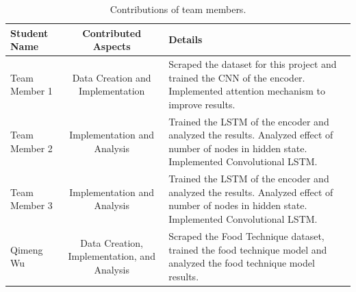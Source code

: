 \documentclass[10pt,twocolumn,letterpaper]{article}
\begin{document}
\begin{table}
\begin{center}
\begin{tabular}{|l|c|p{8cm}|}
\hline
Student Name & Contributed Aspects & Details \\
\hline\hline
Team Member 1 & Data Creation and Implementation & Scraped the dataset for this project and trained the CNN of the encoder. Implemented attention mechanism to improve results. \\
Team Member 2 & Implementation and Analysis & Trained the LSTM of the encoder and analyzed the results. Analyzed effect of number of nodes in hidden state.  Implemented Convolutional LSTM. \\
Team Member 3 & Implementation and Analysis & Trained the LSTM of the encoder and analyzed the results. Analyzed effect of number of nodes in hidden state.  Implemented Convolutional LSTM. \\
Qimeng Wu & Data Creation, Implementation, and Analysis & Scraped the Food Technique dataset, trained the food technique model and analyzed the food technique model results.
\end{tabular}
\end{center}
\caption{Contributions of team members.}
\label{tab:contributions}
\end{table}


\newpage
\newpage


{\small


}
\end{document}
